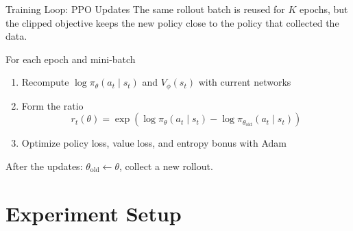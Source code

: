 \documentclass[aspectratio=169, 11pt]{beamer}
\begin{document}
\begin{frame}{Training Loop: PPO Updates}
  The same rollout batch is reused for $K$ epochs, but the clipped objective keeps
  the new policy close to the policy that collected the data.

  \vspace{0.4em}
  \begin{block}{For each epoch and mini-batch}
    \begin{enumerate}
      \item Recompute $\log\pi_\theta(a_t\mid s_t)$ and $V_\phi(s_t)$ with current networks
      \item Form the ratio
        \[
          r_t(\theta)=\exp\!\left(\log\pi_\theta(a_t\mid s_t)
          -\log\pi_{\theta_{\mathrm{old}}}(a_t\mid s_t)\right)
        \]
      \item Optimize policy loss, value loss, and entropy bonus with Adam
    \end{enumerate}
  \end{block}

  \centering
  \small After the updates: $\theta_{\mathrm{old}}\leftarrow\theta$, collect a new rollout.
\end{frame}

\section{Experiment Setup}
\end{document}
